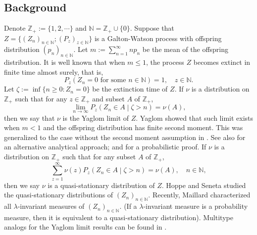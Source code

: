 \documentclass[12pt,a4paper]{amsart}
\numberwithin{equation}{section}
\theoremstyle{plain}
\theoremstyle{definition}
\theoremstyle{remark}
\begin{document}
\subsection{Background}\label{sec:BGD}
	Denote $\mathbb Z_+:= \{1,2,\cdots\}$ and $\mathbb N = \mathbb Z_+ \cup \{0\}$. 
	Suppose that $Z=\{(Z_n)_{n\in \mathbb N}; (P_z)_{z\in \mathbb N}\}$
	is a Galton-Watson process with offspring distribution
		$(p_n)_{n\in \mathbb N}$.
	Let $m:=\sum^{\infty}_{n=1}np_n$ be the mean
	of the offspring distribution.
	It is well known that when $m\leq 1$,
	the process $Z$ becomes extinct in finite time almost surely, that is,
\[
	P_z(Z_n = 0 \text{ for some $n \in \mathbb N$} ) = 1, \quad z \in \mathbb N.
\]
	Let $\zeta:=\inf\{n\geq 0: Z_n=0\}$ be the extinction time of $Z$.
	If $\nu$ is a distribution on
	$\mathbb Z_+$ such that for any $z\in \mathbb Z_+$ and subset $A$ of $\mathbb Z_+$, 
\[
	\lim_{n\rightarrow\infty} P_z\left(Z_n\in A\middle|\zeta>n \right)=\nu(A), 
\]
	then we say that $\nu$ is the Yaglom limit of $Z$.
	Yaglom \cite{Yaglom47} showed that such limit exists when $m < 1$ and the offspring distribution has finite second moment.
	This was generalized to the case without the second moment assumption
	in \cite{Heathcote, Joffe1967On}.
	See also \cite[pp. 64--65]{AthreyaNey1972Branching} for an alternative analytical approach; and \cite{LyonsPemantlePeres1995Conceptual} for a probabilistic proof.
	If $\nu$ is a distribution on $\mathbb Z_+$ such that for any subset $A$ of $\mathbb Z_+$,
\[
	\sum_{z = 1}^\infty \nu(z) P_z\left(Z_n\in A\middle|\zeta>n \right)
	=\nu(A), \quad n \in \mathbb N,
\]
	then we say $\nu$ is a quasi-stationary distribution of $Z$.
	Hoppe and Seneta \cite{HoppeSeneta1978Analytical} studied the quasi-stationary distributions of $(Z_n)_{n\in \mathbb N}$.
	Recently, Maillard \cite{Maillard2018The}
characterized all  $\lambda$-invariant measures of $(Z_n)_{n \in \mathbb N}$.
(If a $\lambda$-invariant measure is a probability measure, then it is equivalent to a quasi-stationary distribution).
	Multitype analogs for the Yaglom limit results can be found in
	\cite{Hoppe1975Stationary, HoppeSeneta1978Analytical, JoffeSpitzer1967On}.
\end{document}
